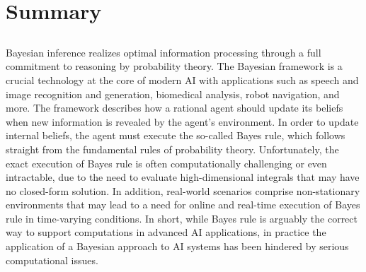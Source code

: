 
\chapter*{Summary}
\thispagestyle{empty}
\section*{\myTitleBreak}


Bayesian inference realizes optimal information processing through a full commitment to reasoning by probability theory.
The Bayesian framework is a crucial technology at the core of modern AI with applications such as speech and image recognition and generation, biomedical analysis, robot navigation, and more.
The framework describes how a rational agent should update its beliefs when new information is revealed by the agent’s environment.
In order to update internal beliefs, the agent must execute the so-called Bayes rule, which follows straight from the fundamental rules of probability theory. Unfortunately, the exact execution of Bayes rule is often computationally challenging or even intractable, due to the need to evaluate high-dimensional integrals that may have no closed-form solution.
In addition, real-world scenarios comprise non-stationary environments that may lead to a need for online and real-time execution of Bayes rule in time-varying conditions. In short, while Bayes rule is arguably the correct way to support computations in advanced AI applications, in practice the application of a Bayesian approach to AI systems has been hindered by serious computational issues. 

